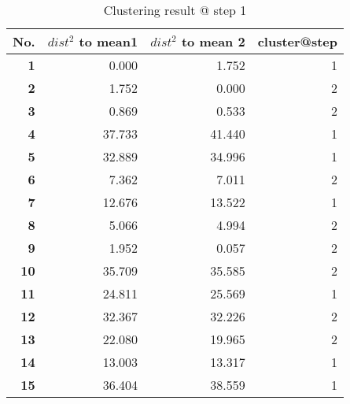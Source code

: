 \begin{table}[htbp]
  \centering
  \caption{Clustering result @ step 1}
    \begin{tabular}{rrrr}
    \toprule
    \textbf{No.} & \textbf{$dist^2$ to mean1} & \textbf{$dist^2$ to mean 2} & \textbf{cluster@step} \\
    \midrule
    \textbf{1} & 0.000  & 1.752  & 1 \\
    \textbf{2} & 1.752  & 0.000  & 2 \\
    \textbf{3} & 0.869  & 0.533  & 2 \\
    \textbf{4} & 37.733  & 41.440  & 1 \\
    \textbf{5} & 32.889  & 34.996  & 1 \\
    \textbf{6} & 7.362  & 7.011  & 2 \\
    \textbf{7} & 12.676  & 13.522  & 1 \\
    \textbf{8} & 5.066  & 4.994  & 2 \\
    \textbf{9} & 1.952  & 0.057  & 2 \\
    \textbf{10} & 35.709  & 35.585  & 2 \\
    \textbf{11} & 24.811  & 25.569  & 1 \\
    \textbf{12} & 32.367  & 32.226  & 2 \\
    \textbf{13} & 22.080  & 19.965  & 2 \\
    \textbf{14} & 13.003  & 13.317  & 1 \\
    \textbf{15} & 36.404  & 38.559  & 1 \\
    \bottomrule
    \end{tabular}%
  \label{tab:cluster_a1}%
\end{table}%
